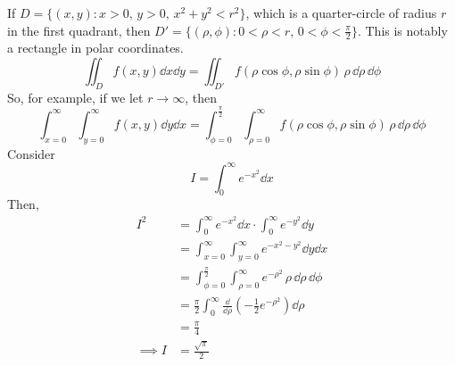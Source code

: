 If \(D = \{ (x, y) \colon x > 0,\, y > 0,\, x^2 + y^2 < r^2 \}\), which is a quarter-circle of radius \(r\) in the first quadrant, then \(D' = \{ (\rho, \phi) \colon 0 < \rho < r,\, 0 < \phi < \frac{\pi}{2} \}\). This is notably a rectangle in polar coordinates.
\[ \iint_D f(x, y)\dd{x} \dd{y} = \iint_{D'} f(\rho \cos \phi, \rho \sin \phi) \,\rho \,\dd \rho \,\dd \phi \]
So, for example, if we let \(r \to \infty\), then
\[ \int_{x=0}^\infty \int_{y=0}^\infty f(x, y) \dd{y}\dd{x} = \int_{\phi = 0}^{\frac{\pi}{2}} \int_{\rho = 0}^\infty f(\rho \cos \phi, \rho \sin \phi) \,\rho\,\dd \rho\,\dd \phi \]
Consider
\[ I = \int_0^\infty e^{-x^2} \dd{x} \]
Then,
\begin{align*}
	I^2        & = \int_0^\infty e^{-x^2} \dd{x} \cdot \int_0^\infty e^{-y^2} \dd{y}                                \\
	           & = \int_{x=0}^\infty \int_{y=0}^\infty e^{-x^2-y^2} \dd{y}\dd{x}                                    \\
	           & = \int_{\phi = 0}^{\frac{\pi}{2}} \int_{\rho = 0}^\infty e^{-\rho^2} \,\rho\,\dd \rho\,\dd \phi    \\
	           & = \frac{\pi}{2} \int_0^\infty \frac{\dd}{\dd \rho} \left( -\frac{1}{2}e^{-\rho^2} \right) \dd \rho \\
	           & = \frac{\pi}{4}                                                                                    \\
	\implies I & = \frac{\sqrt{\pi}}{2}
\end{align*}
